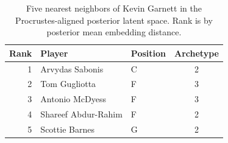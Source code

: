 \begin{table}[htbp]
  \centering\small
  \begin{tabular}{rllc}
    \toprule
    Rank & Player & Position & Archetype \\
    \midrule
    1 & Arvydas Sabonis & C & 2 \\
    2 & Tom Gugliotta & F & 3 \\
    3 & Antonio McDyess & F & 3 \\
    4 & Shareef Abdur-Rahim & F & 2 \\
    5 & Scottie Barnes & G & 2 \\
    \bottomrule
  \end{tabular}
  \caption{Five nearest neighbors of Kevin Garnett in the Procrustes-aligned posterior latent space. Rank is by posterior mean embedding distance.}
  \label{tab:Kevin_Garnett_neighbors}
\end{table}

